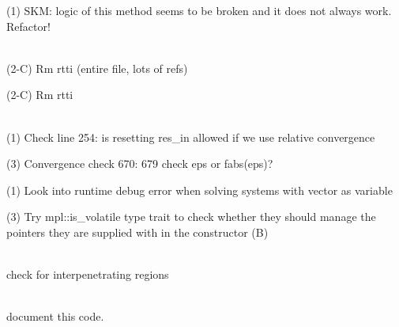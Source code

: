 \begin{DoxyRefList}
\label{todo__todo000185}%
%
(1) SKM\+: logic of this method seems to be broken and it does not always work. Refactor!  
\item[Member \doxylink{classcsmp_1_1_relative_permeability_model___test_af3f119bf84b5568d23c77774669ef805}{csmp\+::Relative\+Permeability\+Model\+\_\+\+Test\+::Test} (\doxylink{classcsmp_1_1_two_phase_model}{Two\+Phase\+Model$<$ 1\+U $>$} \&relperm, bool extended\+\_\+property\+\_\+set)]\hfill \\
\label{todo__todo000266}%
%
(2-\/C) Rm rtti (entire file, lots of refs) 

\label{todo__todo000267}%
%
(2-\/C) Rm rtti  
\item[Class \doxylink{classcsmp_1_1_s_a_m_g___solver}{csmp\+::SAMG\+\_\+\+Solver} ]\hfill \\
\label{todo__todo000116}%
%
(1) Check line 254\+: is resetting res\+\_\+in allowed if we use relative convergence 



(3) Convergence check 670\+: 679 check eps or fabs(eps)? 



(1) Look into runtime debug error when solving systems with vector as variable 



(3) Try mpl\+::is\+\_\+volatile type trait to check whether they should manage the pointers they are supplied with in the constructor (B) 
\item[Member \doxylink{namespacecsmp_af11f454fe5096d50e75016d6ad001ba4}{csmp\+::shared\+Perimeter\+Cells} (const \doxylink{classcsmp_1_1_model_sub_domain}{Model\+Sub\+Domain$<$ dim, CELL $>$} \&subdomain1, const \doxylink{classcsmp_1_1_model_sub_domain}{Model\+Sub\+Domain$<$ dim, CELL $>$} \&subdomain2, vector\texorpdfstring{$<$}{<} pair\texorpdfstring{$<$}{<} pair\texorpdfstring{$<$}{<} CELL$<$ dim $>$ \texorpdfstring{$\ast$}{*}, uint32\+\_\+t \texorpdfstring{$>$}{>}, pair\texorpdfstring{$<$}{<} CELL$<$ dim $>$ \texorpdfstring{$\ast$}{*}, uint32\+\_\+t \texorpdfstring{$>$}{>} \texorpdfstring{$>$}{>} \texorpdfstring{$>$}{>} \&matching\+\_\+cells)]\hfill \\
\label{todo__todo000172}%
%
check for interpenetrating regions 
\item[Class \doxylink{classcsmp_1_1_simulator_control}{csmp\+::Simulator\+Control\texorpdfstring{$<$}{<} dim \texorpdfstring{$>$}{>}} ]\hfill \\
\label{todo__todo000203}%
%
document this code.


\end{DoxyRefList}
